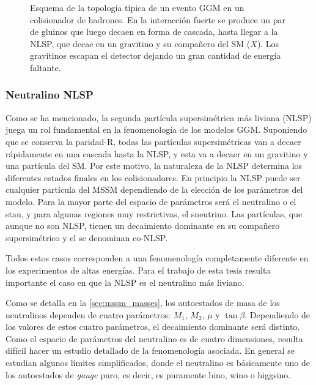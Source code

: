 \begin{figure}[!htbp]
  \centering

  

  \caption{Esquema de la topología típica de un evento GGM en un colisionador de
    hadrones. En la interacción fuerte se produce un par de gluinos que luego
    decaen en forma de cascada, hasta llegar a la NLSP, que decae en un
    gravitino {\gravino} y su compañero del SM ($X$). Los gravitinos escapan el
    detector dejando un gran cantidad de energía faltante.}
  \label{fig:ggm_event}
\end{figure}


\subsubsection{Neutralino NLSP}

Como se ha mencionado, la segunda partícula supersimétrica más liviana (NLSP)
juega un rol fundamental en la fenomenología de los modelos GGM. Suponiendo que
se conserva la paridad-R, todas las partículas supersimétricas van a decaer
rápidamente en una cascada hasta la NLSP, y esta va a decaer en un gravitino y
una partícula del SM. Por este motivo, la naturaleza de la NLSP determina los
diferentes estados finales en los colisionadores. En principio la NLSP puede ser
cualquier partícula del MSSM dependiendo de la elección de los parámetros del
modelo. Para la mayor parte del espacio de parámetros será el neutralino o el
stau, y para algunas regiones muy restrictivas, el
sneutrino\cite{arxiv:9801271}. Las partículas, que aunque no son NLSP, tienen un
decaimiento dominante en su compañero supersimétrico y el {\gravino} se
denominan co-NLSP.

Todos estos casos corresponden a una fenomenología completamente diferente en
los experimentos de altas energías. Para el trabajo de esta tesis resulta
importante el caso en que la NLSP es el neutralino más liviano.

Como se detalla en la \cref{sec:mssm_masses}, los autoestados de masa de los
neutralinos dependen de cuatro parámetros: $M_1$, $M_2$, $\mu$ y $\tan\beta$.
Dependiendo de los valores de estos cuatro parámetros, el decaimiento dominante
será distinto. Como el espacio de parámetros del neutralino es de cuatro
dimensiones, resulta difícil hacer un estudio detallado de la fenomenología asociada.
En general se estudian algunos límites simplificados, donde el neutralino
es básicamente uno de los autoestados de \emph{gauge} puro, es decir, es puramente
bino, wino o higgsino.

